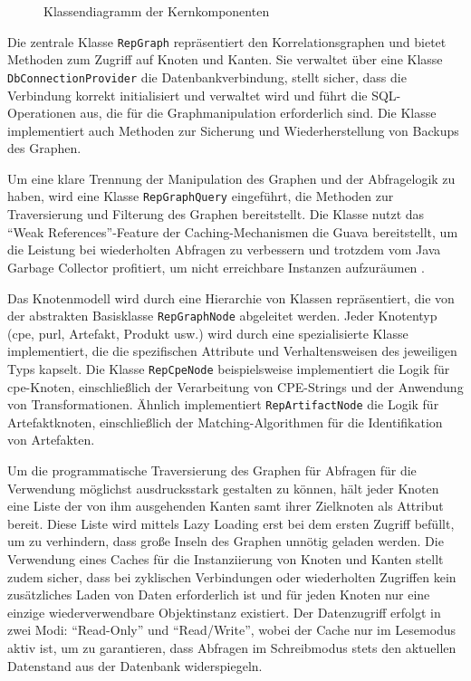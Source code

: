 \begin{figure}[htbp]
    \centering
    \makebox[\textwidth]{}
    \caption{Klassendiagramm der Kernkomponenten}
    \label{fig:impl-class-diagram-core-model}
\end{figure}

Die zentrale Klasse \texttt{RepGraph} repräsentiert den Korrelationsgraphen und bietet Methoden zum Zugriff auf Knoten und Kanten.
Sie verwaltet über eine Klasse \texttt{DbConnectionProvider} die Datenbankverbindung, stellt sicher, dass die Verbindung korrekt initialisiert und verwaltet wird und führt die SQL-Operationen aus, die für die Graphmanipulation erforderlich sind.
Die Klasse implementiert auch Methoden zur Sicherung und Wiederherstellung von Backups des Graphen.

Um eine klare Trennung der Manipulation des Graphen und der Abfragelogik zu haben, wird eine Klasse \texttt{RepGraphQuery} eingeführt, die Methoden zur Traversierung und Filterung des Graphen bereitstellt.
Die Klasse nutzt das \enquote{Weak References}-Feature der Caching-Mechanismen die Guava bereitstellt, um die Leistung bei wiederholten Abfragen zu verbessern und trotzdem vom Java Garbage Collector profitiert, um nicht erreichbare Instanzen aufzuräumen \autocite{GuavaCachesExplained}.

Das Knotenmodell wird durch eine Hierarchie von Klassen repräsentiert, die von der abstrakten Basisklasse \texttt{RepGraphNode} abgeleitet werden.
Jeder Knotentyp (\acrshort{cpe}, \acrshort{purl}, Artefakt, Produkt usw.) wird durch eine spezialisierte Klasse implementiert, die die spezifischen Attribute und Verhaltensweisen des jeweiligen Typs kapselt.
Die Klasse \texttt{RepCpeNode} beispielsweise implementiert die Logik für \acrshort{cpe}-Knoten, einschließlich der Verarbeitung von CPE-Strings und der Anwendung von Transformationen.
Ähnlich implementiert \texttt{RepArtifactNode} die Logik für Artefaktknoten, einschließlich der Matching-Algorithmen für die Identifikation von Artefakten.

Um die programmatische Traversierung des Graphen für Abfragen für die Verwendung möglichst ausdrucksstark gestalten zu können, hält jeder Knoten eine Liste der von ihm ausgehenden Kanten samt ihrer Zielknoten als Attribut bereit.
Diese Liste wird mittels Lazy Loading erst bei dem ersten Zugriff befüllt, um zu verhindern, dass große Inseln des Graphen unnötig geladen werden.
Die Verwendung eines Caches für die Instanziierung von Knoten und Kanten stellt zudem sicher, dass bei zyklischen Verbindungen oder wiederholten Zugriffen kein zusätzliches Laden von Daten erforderlich ist und für jeden Knoten nur eine einzige wiederverwendbare Objektinstanz existiert.
Der Datenzugriff erfolgt in zwei Modi: \enquote{Read-Only} und \enquote{Read/Write}, wobei der Cache nur im Lesemodus aktiv ist, um zu garantieren, dass Abfragen im Schreibmodus stets den aktuellen Datenstand aus der Datenbank widerspiegeln.

